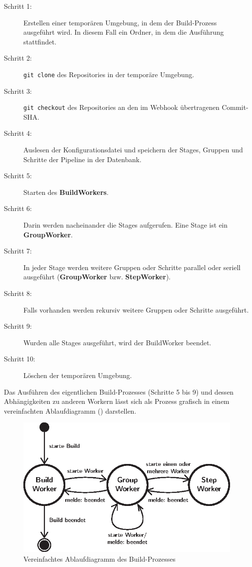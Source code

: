 \begin{description}
  \item[Schritt 1:] Erstellen einer temporären Umgebung, in dem der Build-Prozess ausgeführt wird. In diesem Fall ein Ordner, in dem die Ausführung stattfindet.
  \item[Schritt 2:] \texttt{git clone} des Repositories in der temporäre Umgebung.
  \item[Schritt 3:] \texttt{git checkout} des Repositories an den im Webhook übertragenen Commit-SHA.
  \item[Schritt 4:] Auslesen der Konfigurationsdatei und speichern der Stages, Gruppen und Schritte der Pipeline in der Datenbank.
  \item[Schritt 5:] Starten des \textbf{BuildWorkers}.
  \item[Schritt 6:] Darin werden nacheinander die Stages aufgerufen. Eine Stage ist ein \textbf{GroupWorker}.
  \item[Schritt 7:] In jeder Stage werden weitere Gruppen oder Schritte parallel oder seriell ausgeführt (\textbf{GroupWorker} bzw. \textbf{StepWorker}).
  \item[Schritt 8:] Falls vorhanden werden rekursiv weitere Gruppen oder Schritte ausgeführt.
  \item[Schritt 9:] Wurden alle Stages ausgeführt, wird der BuildWorker beendet.
  \item[Schritt 10:] Löschen der temporären Umgebung.
\end{description}

Das Ausführen des eigentlichen Build-Prozesses (Schritte 5 bis 9) und dessen Abhängigkeiten zu anderen Workern lässt sich als Prozess grafisch in einem vereinfachten Ablaufdiagramm () darstellen.

\begin{figure}[h]
  \caption{Vereinfachtes Ablaufdiagramm des Build-Prozesses}
  \label{fig:ablauf-build-prozess}
  \centering
    \includegraphics[width=.7\textwidth]{assets/worker_diagram}
\end{figure}

